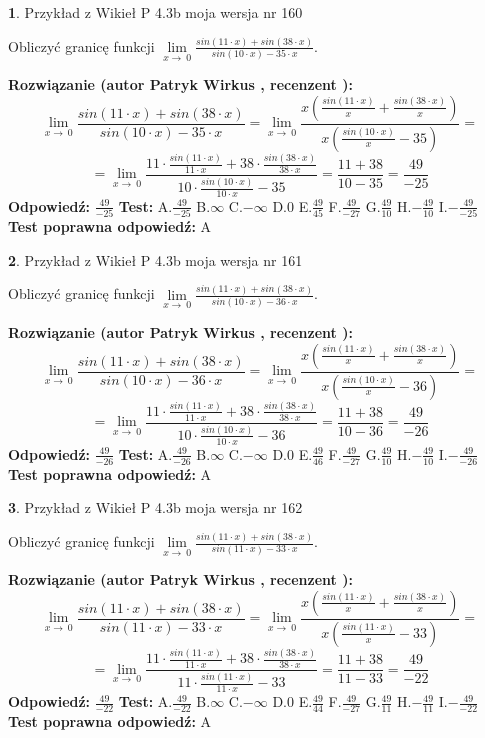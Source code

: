 \documentclass[12pt, a4paper]{article}
\theoremstyle{definition} %
\newtheorem{zad}{}
\newcommand{\zadStart}[1]{\begin{zad}#1\newline}
\newcommand{\zadStop}{\end{zad}}
\newcommand{\rozwStart}[2]{\noindent \textbf{Rozwiązanie (autor #1 , recenzent #2): }\newline}
\newcommand{\rozwStop}{\newline}
\newcommand{\odpStart}{\noindent \textbf{Odpowiedź:}\newline}
\newcommand{\odpStop}{\newline}
\newcommand{\testStart}{\noindent \textbf{Test:}\newline}
\newcommand{\testStop}{\newline}
\newcommand{\kluczStart}{\noindent \textbf{Test poprawna odpowiedź:}\newline}
\newcommand{\kluczStop}{\newline}
\begin{document}
\zadStart{Przykład z Wikieł P 4.3b moja wersja nr 160}


Obliczyć granicę funkcji $\lim\limits_{x\to\ 0}\frac{sin(11 \cdot x)+sin(38 \cdot x)}{sin(10 \cdot x)-35 \cdot x}$.
\zadStop
\rozwStart{Patryk Wirkus}{}
$$\lim\limits_{x\to\ 0}\frac{sin(11 \cdot x)+sin(38 \cdot x)}{sin(10 \cdot x)-35 \cdot x}=\lim\limits_{x\to\ 0}\frac{x(\frac{sin(11 \cdot x)}{x}+\frac{sin(38 \cdot x)}{x})}{x(\frac{sin(10 \cdot x)}{x}-35)}=$$
$$=\lim\limits_{x\to\ 0}\frac{11 \cdot \frac{sin(11 \cdot x)}{11 \cdot x}+38 \cdot \frac{sin(38 \cdot x)}{38 \cdot x}}{10 \cdot \frac{sin(10 \cdot x)}{10 \cdot x}-35}=\frac{11+38}{10-35} = \frac{49}{-25}$$
\rozwStop
\odpStart
$\frac{49}{-25}$
\odpStop
\testStart
A.$\frac{49}{-25}$
B.$\infty$
C.$-\infty$
D.$0$
E.$\frac{49}{45}$
F.$\frac{49}{-27}$
G.$\frac{49}{10}$
H.$-\frac{49}{10}$
I.$-\frac{49}{-25}$
\testStop
\kluczStart
A
\kluczStop



\zadStart{Przykład z Wikieł P 4.3b moja wersja nr 161}


Obliczyć granicę funkcji $\lim\limits_{x\to\ 0}\frac{sin(11 \cdot x)+sin(38 \cdot x)}{sin(10 \cdot x)-36 \cdot x}$.
\zadStop
\rozwStart{Patryk Wirkus}{}
$$\lim\limits_{x\to\ 0}\frac{sin(11 \cdot x)+sin(38 \cdot x)}{sin(10 \cdot x)-36 \cdot x}=\lim\limits_{x\to\ 0}\frac{x(\frac{sin(11 \cdot x)}{x}+\frac{sin(38 \cdot x)}{x})}{x(\frac{sin(10 \cdot x)}{x}-36)}=$$
$$=\lim\limits_{x\to\ 0}\frac{11 \cdot \frac{sin(11 \cdot x)}{11 \cdot x}+38 \cdot \frac{sin(38 \cdot x)}{38 \cdot x}}{10 \cdot \frac{sin(10 \cdot x)}{10 \cdot x}-36}=\frac{11+38}{10-36} = \frac{49}{-26}$$
\rozwStop
\odpStart
$\frac{49}{-26}$
\odpStop
\testStart
A.$\frac{49}{-26}$
B.$\infty$
C.$-\infty$
D.$0$
E.$\frac{49}{46}$
F.$\frac{49}{-27}$
G.$\frac{49}{10}$
H.$-\frac{49}{10}$
I.$-\frac{49}{-26}$
\testStop
\kluczStart
A
\kluczStop



\zadStart{Przykład z Wikieł P 4.3b moja wersja nr 162}


Obliczyć granicę funkcji $\lim\limits_{x\to\ 0}\frac{sin(11 \cdot x)+sin(38 \cdot x)}{sin(11 \cdot x)-33 \cdot x}$.
\zadStop
\rozwStart{Patryk Wirkus}{}
$$\lim\limits_{x\to\ 0}\frac{sin(11 \cdot x)+sin(38 \cdot x)}{sin(11 \cdot x)-33 \cdot x}=\lim\limits_{x\to\ 0}\frac{x(\frac{sin(11 \cdot x)}{x}+\frac{sin(38 \cdot x)}{x})}{x(\frac{sin(11 \cdot x)}{x}-33)}=$$
$$=\lim\limits_{x\to\ 0}\frac{11 \cdot \frac{sin(11 \cdot x)}{11 \cdot x}+38 \cdot \frac{sin(38 \cdot x)}{38 \cdot x}}{11 \cdot \frac{sin(11 \cdot x)}{11 \cdot x}-33}=\frac{11+38}{11-33} = \frac{49}{-22}$$
\rozwStop
\odpStart
$\frac{49}{-22}$
\odpStop
\testStart
A.$\frac{49}{-22}$
B.$\infty$
C.$-\infty$
D.$0$
E.$\frac{49}{44}$
F.$\frac{49}{-27}$
G.$\frac{49}{11}$
H.$-\frac{49}{11}$
I.$-\frac{49}{-22}$
\testStop
\kluczStart
A
\kluczStop
\end{document}

